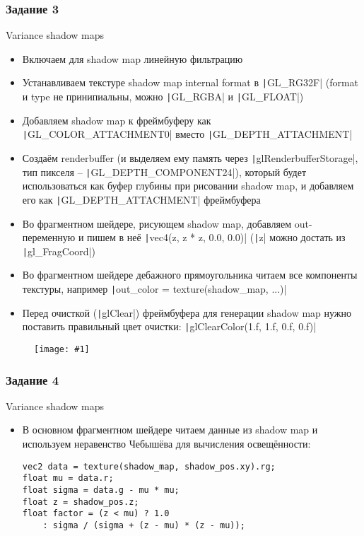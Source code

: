 \documentclass[10pt]{beamer}
\newcommand{\slideimage}[1]{
  \begin{figure}
    \begin{adjustbox}{width=\textwidth, totalheight=\textheight-2\baselineskip-2\baselineskip,keepaspectratio}
      \texttt{[image: \#1]}
    \end{adjustbox}
  \end{figure}
}
\begin{document}
\begin{frame}[fragile]
\frametitle{Задание 3}
\fontsize{10pt}{10pt}
\begin{footnotesize}
Variance shadow maps
\begin{itemize}
\item Включаем для shadow map линейную фильтрацию
\item Устанавливаем текстуре shadow map internal format в \texttt|GL_RG32F| (format и type не принипиальны, можно \texttt|GL_RGBA| и \texttt|GL_FLOAT|)
\item Добавляем shadow map к фреймбуферу как \texttt|GL_COLOR_ATTACHMENT0| вместо \texttt|GL_DEPTH_ATTACHMENT|
\item Создаём renderbuffer (и выделяем ему память через \texttt|glRenderbufferStorage|, тип пикселя -- \texttt|GL_DEPTH_COMPONENT24|), который будет использоваться как буфер глубины при рисовании shadow map, и добавляем его как \texttt|GL_DEPTH_ATTACHMENT| фреймбуфера
\item Во фрагментном шейдере, рисующем shadow map, добавляем out-переменную и пишем в неё \texttt|vec4(z, z * z, 0.0, 0.0)| (\texttt|z| можно достать из \texttt|gl_FragCoord|)
\item Во фрагментном шейдере дебажного прямоугольника читаем все компоненты текстуры, например \texttt|out_color = texture(shadow_map, ...)|
\item Перед очисткой (\texttt|glClear|) фреймбуфера для генерации shadow map нужно поставить правильный цвет очистки: \texttt|glClearColor(1.f, 1.f, 0.f, 0.f)|
\end{itemize}
\end{footnotesize}
\end{frame}

\begin{frame}[fragile]
\slideimage{3.png}
\end{frame}

\begin{frame}[fragile]
\frametitle{Задание 4}
\fontsize{10pt}{10pt}
Variance shadow maps
\begin{itemize}
\item В основном фрагментном шейдере читаем данные из shadow map и используем неравенство Чебышёва для вычисления освещённости:
\begin{verbatim}
vec2 data = texture(shadow_map, shadow_pos.xy).rg;
float mu = data.r;
float sigma = data.g - mu * mu;
float z = shadow_pos.z;
float factor = (z < mu) ? 1.0
    : sigma / (sigma + (z - mu) * (z - mu));
\end{verbatim}
\end{itemize}
\end{frame}
\end{document}

